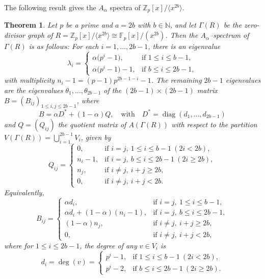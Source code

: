 \documentclass[12pt,twoside]{article}
\newtheorem{theorem}{Theorem}[section]
\begin{document}
 The following result gives the $A_{\alpha}$ spectra of $\mathbb{Z}_p[x]/\langle x^{2b}\rangle.$
\begin{theorem}\label{spectra thm even}
	Let $p$ be a prime and $a=2b$ with $b\in \mathbb{N}$, and let $ \varGamma(R)$ be the zero-divisor graph of $R = \mathbb{Z}_p[x]/\langle x^{2b}\rangle \cong \mathbb{F}_p[x]/(x^{2b})$. 	Then the $A_\alpha$--spectrum of $ \varGamma(R)$ is as follows: For each $i=1,\dots,2b-1$, there is an eigenvalue
		\[
		\lambda_i =
		\begin{cases}
			\alpha\bigl(p^{ i}-1\bigr), & \text{if } 1\le i \le b-1,\\[3pt]
			\alpha\bigl(p^{ i}-1\bigr) - 1, & \text{if } b\le i \le 2b-1,
		\end{cases}
		\]
		with multiplicity $n_i - 1 = (p-1)p^{ 2b-1-i} - 1$. The remaining $2b-1$ eigenvalues are the eigenvalues
		$\theta_1,\dots,\theta_{2b-1}$ of the $(2b-1)\times(2b-1)$ matrix
		$B=(B_{ij})_{1\le i,j\le 2b-1}$, where
		\[
		B = \alpha D^\ast + (1-\alpha)Q,\quad \text{with}\quad
		D^\ast = \operatorname{diag}(d_1,\dots,d_{2b-1})
		\]
		and $Q=(Q_{ij})$ the quotient matrix of $A( \varGamma(R))$
		with respect to the partition $V( \varGamma(R))=\bigcup_{i=1}^{2b-1}V_i$, given by
		\[
		Q_{ij} =
		\begin{cases}
			0, & \text{if } i=j,\ 1\le i\le b-1\ (2i<2b),\\[3pt]
			n_i - 1, & \text{if } i=j,\ b\le i\le 2b-1\ (2i\ge 2b),\\[3pt]
			n_j, & \text{if } i\ne j,\ i+j\ge 2b,\\[3pt]
			0, & \text{if } i\ne j,\ i+j<2b.
		\end{cases}
		\]
		Equivalently,
		\[
		B_{ij} =
		\begin{cases}
			\alpha d_i, & \text{if } i=j,\ 1\le i\le b-1,\\[3pt]
			\alpha d_i + (1-\alpha)(n_i-1), & \text{if } i=j,\ b\le i\le 2b-1,\\[3pt]
			(1-\alpha)n_j, & \text{if } i\ne j,\ i+j\ge 2b,\\[3pt]
			0, & \text{if } i\ne j,\ i+j<2b,
		\end{cases}
		\]
		where for $1\le i\le 2b-1$, the degree of any $v\in V_i$ is
		\[
		d_i = \deg(v) =
		\begin{cases}
			p^{ i} - 1, & \text{if } 1\le i \le b-1 \ (2i<2b),\\[3pt]
			p^{ i} - 2, & \text{if } b\le i \le 2b-1 \ (2i\ge 2b).
		\end{cases}
		\]
\end{theorem}
\end{document}
